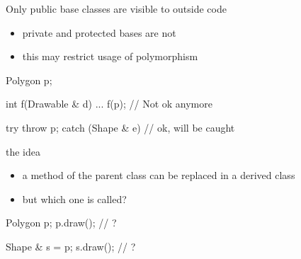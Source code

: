 \begin{frame}[fragile]
  \begin{block}{Only public base classes are visible to outside code}
    \begin{itemize}
    \item private and protected bases are not
    \item this may restrict usage of polymorphism
    \end{itemize}
  \end{block}
  \begin{multicols}{2}
    \begin{cppcode*}{}
      Polygon p;

      int f(Drawable & d) {...}
      f(p);  // Not ok anymore

      try {
        throw p;
      } catch (Shape & e) {
        // ok, will be caught
      }
    \end{cppcode*}
    \columnbreak
    \center
  \end{multicols}
\end{frame}

\begin{frame}[fragile]
  \begin{block}{the idea}
    \begin{itemize}
    \item a method of the parent class can be replaced in a derived class
    \item but which one is called?
    \end{itemize}
  \end{block}
  \begin{multicols}{2}
    \begin{cppcode*}{}
      Polygon p;
      p.draw(); // ?

      Shape & s = p;
      s.draw(); // ?
    \end{cppcode*}
    \columnbreak
    \center
  \end{multicols}
\end{frame}


